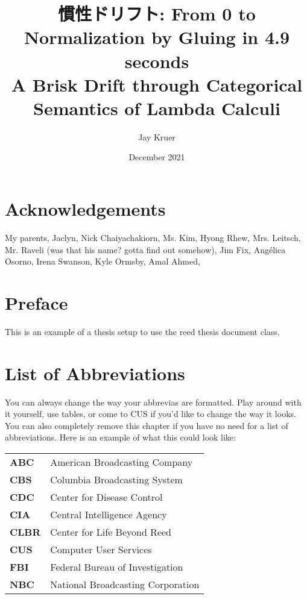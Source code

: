 \documentclass[12pt,twoside]{reedthesis}
\title{慣性ドリフト: From 0 to Normalization by Gluing in 4.9 seconds\\ A Brisk Drift through Categorical Semantics of Lambda Calculi}
\author{Jay Kruer}
\date{December 2021}
\theoremstyle{definition}
\theoremstyle{remark}
\theoremstyle{plain}
\begin{document}
\maketitle
\frontmatter %
\pagestyle{empty} %

\chapter*{Acknowledgements}
My parents, Jaclyn, Nick Chaiyachakiorn, Ms. Kim, Hyong Rhew, Mrs. Leitsch, Mr. Raveli (was that his name? gotta find out
somehow), Jim Fix, Ang\'elica Osorno, Irena Swanson, Kyle Ormsby, Amal Ahmed,

\chapter*{Preface}
This is an example of a thesis setup to use the reed thesis document class.



\chapter*{List of Abbreviations}
You can always change the way your abbrevias are formatted. Play around with it yourself, use tables, or come to CUS if you'd like to change the way it looks. You can also completely remove this chapter if you have no need for a list of abbreviations. Here is an example of what this could look like:

\begin{table}[h]
  \centering %
  \begin{tabular}{ll}
    \textbf{ABC}  	&  American Broadcasting Company \\
    \textbf{CBS}  	&  Columbia Broadcasting System\\
    \textbf{CDC}  	&  Center for Disease Control \\
    \textbf{CIA}  	&  Central Intelligence Agency\\
    \textbf{CLBR} 	&  Center for Life Beyond Reed\\
    \textbf{CUS}  	&  Computer User Services\\
    \textbf{FBI}  	&  Federal Bureau of Investigation\\
    \textbf{NBC}  	&  National Broadcasting Corporation\\
  \end{tabular}
\end{table}
\end{document}
